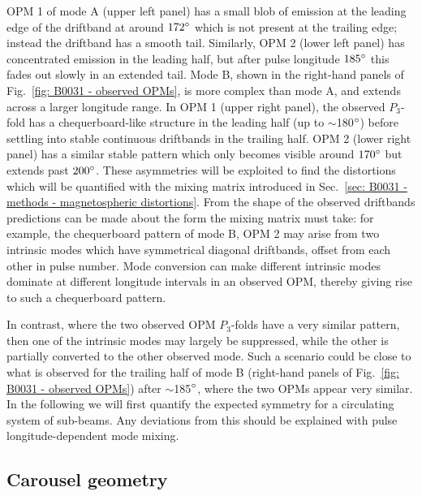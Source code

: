 OPM 1 of mode A (upper left panel) has a small blob of emission at the leading edge of the driftband at around $172^\circ$ which is not present at the trailing edge; instead the driftband has a smooth tail. Similarly, OPM 2 (lower left panel) has concentrated emission in the leading half, but after pulse longitude $185^\circ$ this fades out slowly in an extended tail. Mode B, shown in the right-hand panels of Fig.~\ref{fig: B0031 - observed OPMs}, is more complex than mode A, and extends across a larger longitude range. In OPM 1 (upper right panel), the observed  $P_3$-fold has a chequerboard-like structure in the leading half (up to $\sim$180$^\circ$) before settling into stable continuous driftbands in the trailing half. OPM 2 (lower right panel) has a similar stable pattern which only becomes visible around $170^\circ$ but extends past $200^\circ$. These asymmetries will be exploited to find the distortions which will be quantified with the mixing matrix introduced in Sec.~\ref{sec: B0031 - methods - magnetospheric distortions}. From the shape of the observed driftbands predictions can be made about the form the mixing matrix must take: for example, the chequerboard pattern of mode B, OPM 2 may arise from two intrinsic modes which have symmetrical diagonal driftbands, offset from each other in pulse number. Mode conversion can make different intrinsic modes dominate at different longitude intervals in an observed OPM, thereby giving rise to such a chequerboard pattern.

In contrast, where the two observed OPM  $P_3$-folds have a very similar pattern, then one of the intrinsic modes may largely be suppressed, while the other is partially converted to the other observed mode. Such a scenario could be close to what is observed for the trailing half of mode B (right-hand panels of Fig.~\ref{fig: B0031 - observed OPMs}) after $\sim$185$^\circ$, where the two OPMs appear very similar. In the following we will first quantify the expected symmetry for a circulating system of sub-beams. Any deviations from this should be explained with pulse longitude-dependent mode mixing.










\subsection{Carousel geometry}
\label{sec: B0031 - methods - carousel geometry}

